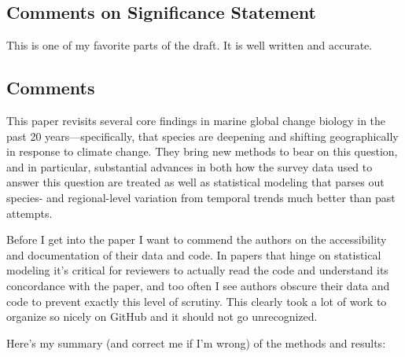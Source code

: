 \documentclass[11pt]{article}
\newcommand{\reviewer}[1]{\par\medskip\noindent\textcolor{revcolor}{#1}\par}
\begin{document}
\subsection*{Comments on Significance Statement}
\reviewer{This is one of my favorite parts of the draft. It is well written and
accurate.}

\subsection*{Comments}

\reviewer{This paper revisits several core findings in marine global change biology
in the past 20 years---specifically, that species are deepening and shifting
geographically in response to climate change. They bring new methods to bear on
this question, and in particular, substantial advances in both how the survey data
used to answer this question are treated as well as statistical modeling that
parses out species- and regional-level variation from temporal trends much better
than past attempts.}

\reviewer{Before I get into the paper I want to commend the authors on the
accessibility and documentation of their data and code. In papers that hinge on
statistical modeling it's critical for reviewers to actually read the code and
understand its concordance with the paper, and too often I see authors obscure
their data and code to prevent exactly this level of scrutiny. This clearly took a
lot of work to organize so nicely on GitHub and it should not go unrecognized.}

\reviewer{Here's my summary (and correct me if I'm wrong) of the methods and
results:}
\end{document}
